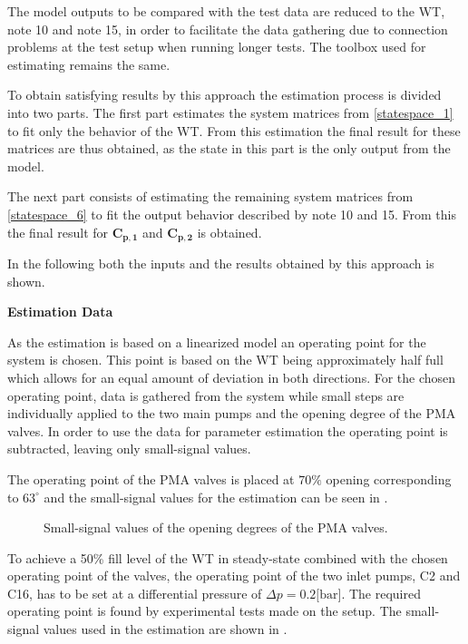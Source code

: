 The model outputs to be compared with the test data are reduced to the WT, note 10 and note 15, in order to facilitate the data gathering due to connection problems at the test setup when running longer tests. The toolbox used for estimating remains the same. 

To obtain satisfying results by this approach the estimation process is divided into two parts. 
The first part estimates the system matrices from \eqref{statespace_1} to fit only the behavior of the WT. From this estimation the final result for these matrices are thus obtained, as the state in this part is the only output from the model.

The next part consists of estimating the remaining system matrices from \eqref{statespace_6} to fit the output behavior described by note 10 and 15. From this the final result for $ \bm{C_{p,1}} $ and $ \bm{C_{p,2}}$ is obtained. 

In the following both the inputs and the results obtained by this approach is shown.

\textbf{Estimation Data}

As the estimation is based on a linearized model an operating point for the system is chosen. This point is based on the WT being approximately half full which allows for an equal amount of deviation in both directions. For the chosen operating point, data is gathered from the system while small steps are individually applied to the two main pumps and the opening degree of the PMA valves. In order to use the data for parameter estimation the operating point is subtracted, leaving only small-signal values.  

The operating point of the PMA valves is placed at $70\%$ opening corresponding to $63^{\circ}$ and the small-signal values for the estimation can be seen in .

\begin{figure}[H]
\centering
 
\caption{Small-signal values of the opening degrees of the PMA valves.}
\label{fig:est_OD_data_final}
\end{figure}

To achieve a 50\% fill level of the WT in steady-state combined with the chosen operating point of the valves, the operating point of the two inlet pumps, C2 and C16, has to be set at a differential pressure of $\Delta p = 0.2 \text{[bar]}$. The required operating point is found by experimental tests made on the setup. The small-signal values used in the estimation are shown in . 

